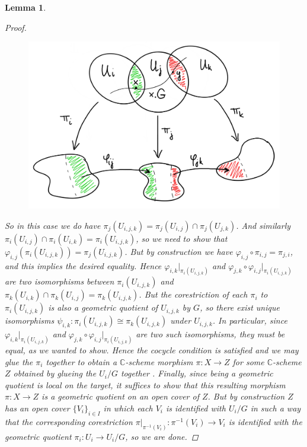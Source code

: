 \documentclass[12pt,a4paper]{amsart}
\theoremstyle{plain}
\newtheorem{lm}[thm]{Lemma}
\theoremstyle{definition}
\theoremstyle{remark}
\begin{document}
\begin{lm}
\begin{proof}
    \begin{figure}[H]
      \centering
      \includegraphics[scale=.9]{pictures/glueing.png}
    \end{figure}

    So in this case we do have $\pi_{j}(U_{i,j,k}) = \pi_{j}(U_{i,j}) \cap \pi_{j}(U_{j,k})$.
    And similarly $\pi_{i}(U_{i,j}) \cap \pi_{i}(U_{i,k}) = \pi_{i}(U_{i,j,k})$, so we need to show that $\varphi_{i,j}(\pi_{i}(U_{i,j,k})) = \pi_{j}(U_{i,j,k})$.
    But by construction we have $\varphi_{i,j} \circ \pi_{i,j} = \pi_{j,i}$, and this implies the desired equality.
    Hence $\varphi_{i,k}|_{\pi_{i}(U_{i,j,k})}$ and $\varphi_{j,k} \circ \varphi_{i,j}|_{\pi_{i}(U_{i,j,k})}$ are two isomorphisms between $\pi_{i}(U_{i,j,k})$ and $\pi_{k}(U_{i,k}) \cap \pi_{k}(U_{i,j}) = \pi_{k}(U_{i,j,k})$.
    But the corestriction of each $\pi_{i}$ to $\pi_{i}(U_{i,j,k})$ is also a geometric quotient of $U_{i,j,k}$ by $G$, so there exist unique isomorphisms $\psi_{i,k} \colon \pi_{i}(U_{i,j,k}) \cong \pi_{k}(U_{i,j,k})$ under $U_{i,j,k}$.
    In particular, since $\varphi_{i,k}|_{\pi_{i}(U_{i,j,k})}$ and $\varphi_{j,k} \circ \varphi_{i,j}|_{\pi_{i}(U_{i,j,k})}$ are two such isomorphisms, they must be equal, as we wanted to show.
    Hence the cocycle condition is satisfied and we may glue the $\pi_{i}$ together to obtain a $\mathbb{C}$-scheme morphism $\pi \colon X \to Z$ for some $\mathbb{C}$-scheme $Z$ obtained by glueing the $U_{i}/G$ together \cite[Exercise II.2.12]{har77}.
    Finally, since being a geometric quotient is local on the target, it suffices to show that this resulting morphism $\pi \colon X \to Z$ is a geometric quotient on an open cover of $Z$.
    But by construction $Z$ has an open cover $\{ V_{i} \}_{i \in I}$ in which each $V_{i}$ is identified with $U_{i}/G$ in such a way that the corresponding corestriction $\pi|_{\pi^{-1}(V_{i})} \colon \pi^{-1}(V_{i}) \to V_{i}$ is identified with the geometric quotient $\pi_{i} \colon U_{i} \to U_{i}/G$, so we are done.
  \end{proof}
\end{lm}
\end{document}
